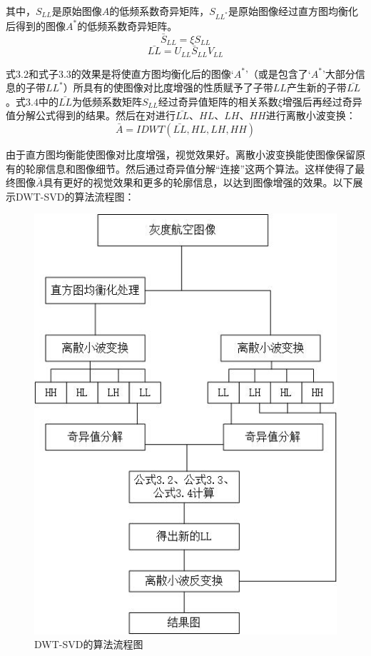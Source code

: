 \documentclass[12pt]{book}
\begin{document}
其中，$S_{LL}$是原始图像$A$的低频系数奇异矩阵，$S_{LL^*}$是原始图像经过直方图均衡化后得到的图像$A^*$的低频系数奇异矩阵。
\begin{equation}     \bar{S}_{LL} = \xi S_{LL}    \end{equation}
\begin{equation}     \bar{LL} =  U_{LL} \bar{S}_{LL} V_{LL} \end{equation}

式$3.2$和式子$3.3$的效果是将使直方图均衡化后的图像‘$A^*$’（或是包含了‘$A^*$’大部分信息的子带$LL^*$）所具有的使图像对比度增强的性质赋予了子带$LL$产生新的子带$\bar{LL}$。式$3.4$中的$\bar{LL}$为低频系数矩阵$S_{LL}$经过奇异值矩阵的相关系数$\xi$增强后再经过奇异值分解公式得到的结果。然后在对进行$\bar{LL}$、$HL$、$LH$、$HH$进行离散小波变换：
\begin{equation}     \bar{A} = IDWT(\bar{LL},HL,LH,HH)    \end{equation}

由于直方图均衡能使图像对比度增强，视觉效果好。离散小波变换能使图像保留原有的轮廓信息和图像细节。然后通过奇异值分解“连接”这两个算法。这样使得了最终图像$\bar{A}$具有更好的视觉效果和更多的轮廓信息，以达到图像增强的效果。以下展示DWT-SVD的算法流程图：
			\begin{figure}[!ht]\centering
				\includegraphics[]{./figures/flowChatOfDWTSVD.jpg}
				\caption{DWT-SVD的算法流程图\label{DWT}}
			\end{figure}
\end{document}
